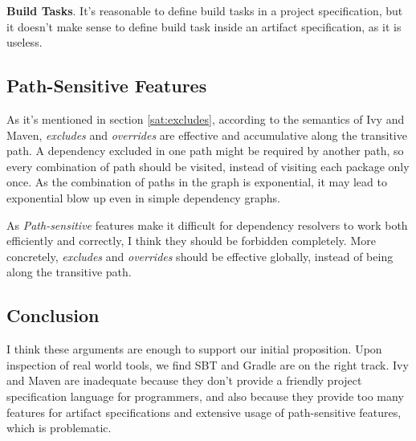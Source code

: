 \textbf{Build Tasks}. It's reasonable to define build tasks in a project specification, but it doesn't make sense to define build task inside an artifact specification, as it is useless.

\subsection{Path-Sensitive Features}

\label{pragmatics:path-sensitive}

As it's mentioned in section \ref{sat:excludes}, according to the semantics of Ivy and Maven, \emph{excludes} and \emph{overrides} are effective and accumulative along the transitive path. A dependency excluded in one path might be required by another path, so every combination of path should be visited, instead of visiting each package only once. As the combination of paths in the graph is exponential, it may lead to exponential blow up even in simple dependency graphs.

As \emph{Path-sensitive} features make it difficult for dependency resolvers to work both efficiently and correctly, I think they should be forbidden completely. More concretely, \emph{excludes} and \emph{overrides} should be effective globally, instead of being along the transitive path.

\subsection{Conclusion}

I think these arguments are enough to support our initial proposition. Upon inspection of real world tools, we find SBT and Gradle are on the right track. Ivy and Maven are inadequate because they don't provide a friendly project specification language for programmers, and also because they provide too many features for artifact specifications and extensive usage of path-sensitive features, which is problematic.
